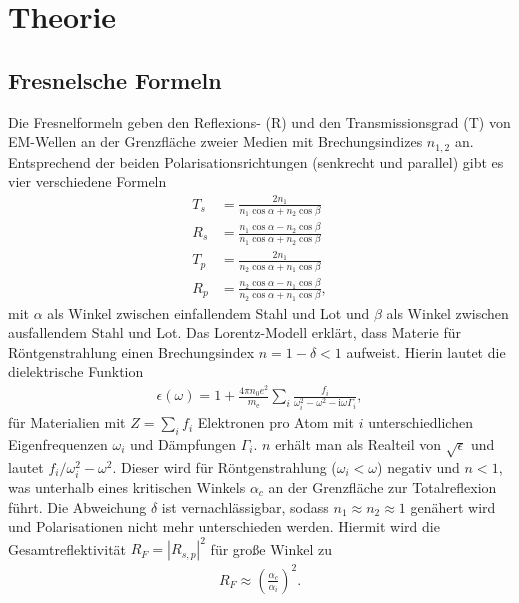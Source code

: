 

\section{Theorie}
\subsection{Fresnelsche Formeln}
Die Fresnelformeln geben den Reflexions- (R) und den Transmissionsgrad (T) von EM-Wellen an der Grenzfläche zweier Medien mit Brechungsindizes $n_{1,2}$ an.
Entsprechend der beiden Polarisationsrichtungen (senkrecht und parallel) gibt es vier verschiedene Formeln
\begin{align}
 T_s &= \frac{2n_1}{n_1 \cos\alpha + n_2\cos\beta}\\
 R_s &= \frac{n_1 \cos\alpha - n_2\cos\beta}{n_1 \cos\alpha + n_2\cos\beta}\\
 T_p &= \frac{2n_1}{n_2 \cos\alpha + n_1\cos\beta}\\
 R_p &= \frac{n_2 \cos\alpha - n_1\cos\beta}{n_2 \cos\alpha + n_1\cos\beta},
\end{align}
\noindent mit $\alpha$ als Winkel zwischen einfallendem Stahl und Lot und $\beta$ als Winkel zwischen ausfallendem Stahl und Lot. Das Lorentz-Modell erklärt,
dass Materie für Röntgenstrahlung einen Brechungsindex $n = 1-\delta <1$ aufweist. Hierin lautet die dielektrische Funktion
\begin{align}
 \epsilon(\omega) = 1 + \frac{4\pi n_0 e^2}{m_\text{e}} \sum\limits_i \frac{f_i}{\omega_i^2 - \omega^2 - \text{i}\omega\Gamma_i},
\end{align}
für Materialien mit $Z=\sum_i f_i$ Elektronen pro Atom mit $i$ unterschiedlichen Eigenfrequenzen $\omega_i$ und Dämpfungen $\Gamma_i$. $n$ erhält man als
Realteil von $\sqrt{\epsilon}$ und lautet $f_i / \omega_i^2 - \omega^2$. Dieser wird für Röntgenstrahlung ($\omega_i <\omega$) negativ und $n<1$, was
unterhalb eines kritischen Winkels $\alpha_c$ an der Grenzfläche zur Totalreflexion führt. Die Abweichung $\delta$ ist vernachlässigbar, sodass 
$n_1 \approx n_2 \approx 1$ genähert wird und Polarisationen nicht mehr unterschieden werden. Hiermit wird die Gesamtreflektivität $R_F = |R_{s,p}|^2$ für
große Winkel zu
\begin{align}
 R_F \approx \left(\frac{\alpha_c}{\alpha_i}\right)^2.
\end{align}


